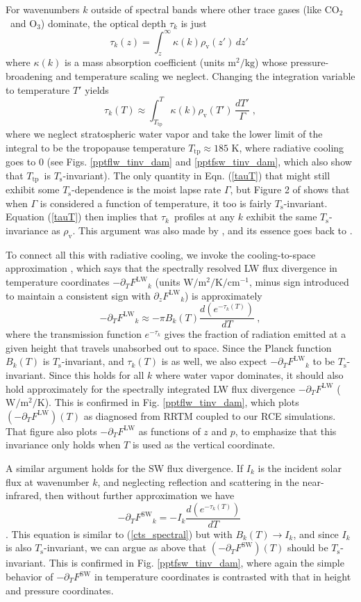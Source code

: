 \documentclass[10pt]{article}
\newcommand{\beqn}{\begin{equation}}
\newcommand{\eeqn}{\end{equation}}
\newcommand{\eqnref}[1]{(\ref{#1})}
\newcommand{\der}[2]{\ensuremath{\frac{d #1}{d #2}}}
\newcommand{\ppz}{\ensuremath{\partial_z}}
\newcommand{\ppt}{\ensuremath{\partial_T}}
\newcommand{\cotwo}{\ensuremath{\mathrm{CO_2}}}
\newcommand{\othree}{\ensuremath{\mathrm{O_3}}}
\newcommand{\FLW}{\ensuremath{F^\mathrm{LW}}}
\newcommand{\FSW}{\ensuremath{F^\mathrm{SW}}}
\newcommand{\cminverse}{\ensuremath{\mathrm{cm^{-1}}}}
\newcommand{\tauk}{\ensuremath{\tau_k}}
\newcommand{\Wmsq}{\ensuremath{\mathrm{W/m^2}}}
\newcommand{\rhov}{\ensuremath{\rho_\mathrm{v}}}
\newcommand{\Ts}{\ensuremath{T_\mathrm{s}}}
\newcommand{\Ttp}{\ensuremath{T_\mathrm{tp}}}
\begin{document}
	 
	For wavenumbers $k$ outside of spectral bands where other trace gases (like \cotwo\ and \othree) dominate, the optical depth $\tauk$ is just
	\beqn
		\tau_k(z) = \int_z^\infty \kappa(k)  \rhov(z') \, dz'  \; 
		\label{tauz}
	\eeqn
		where $\kappa(k)$ is a  mass absorption coefficient  (units $\mathrm{m^2/kg}$) whose pressure-broadening and temperature scaling we neglect. Changing the integration variable to temperature $T'$ yields
		\beqn
		\tau_k(T) \approx \int_{\Ttp}^T \kappa(k)  \rhov(T') \, \frac{dT'}{\Gamma}  \; ,
		\label{tauT}
	\eeqn
	where we neglect stratospheric water vapor and take the lower limit of the integral to be the tropopause temperature $\Ttp \approx 185$ K, where radiative cooling goes to 0 (see Figs. \ref{pptflw_tinv_dam} and  \ref{pptfsw_tinv_dam}, which also show that \Ttp\ is \Ts-invariant). The only quantity in Eqn. \eqnref{tauT} that might still exhibit some \Ts-dependence is the  moist lapse rate $\Gamma$, but Figure 2 of \cite{ingram2010} shows that when $\Gamma$ is considered a function of temperature, it too is fairly  \Ts-invariant. Equation \eqnref{tauT} then implies that \tauk\ profiles at any $k$ exhibit the same \Ts-invariance as \rhov. This argument was also made by \cite{ingram2010}, and its essence goes back to  \cite{simpson1928}.
	
	To connect all this with radiative cooling, we invoke the cooling-to-space  approximation \citep[e.g.,][]{thomas2002, rodgers1966}, which says that the spectrally resolved LW flux divergence in temperature coordinates $-\ppt \FLW_k$ (units $\Wmsq/\mathrm{K}/\cminverse$, minus sign introduced to maintain a consistent sign with  $\ppz \FLW_k$) is approximately
	\beqn
		-\ppt \FLW_k \approx - \pi B_k(T) \frac{d (e^{-\tauk(T)})}{dT} \ ,
	\label{cts_spectral}
	\eeqn
where  the transmission function $e^{-\tauk}$ gives the fraction of radiation emitted at a given height that travels unabsorbed out to space. Since the Planck function $B_k(T)$ is \Ts-invariant, and $\tauk(T)$ is as well, we also expect $-\ppt \FLW_k$ to be \Ts-invariant. Since this holds for all $k$ where water vapor dominates, it should also hold approximately for the spectrally integrated LW flux divergence $-\ppt \FLW$ ($\Wmsq/\mathrm{K}$). This is confirmed in  Fig.  \ref{pptflw_tinv_dam}, which plots $(-\ppt \FLW)(T)$ as diagnosed from RRTM coupled to our  RCE simulations.  That figure also plots $-\ppt \FLW$ as functions of $z$ and $p$, to emphasize that this invariance only holds  when $T$ is used as the vertical coordinate.
	

	A similar argument holds for the SW flux divergence. If $I_k$ is the incident solar flux at wavenumber $k$, and  neglecting reflection and scattering in the  near-infrared, 
then without further approximation we have
	\beqn
		-\ppt \FSW_k = - I_k \der{(e^{-\tauk(T)})}{T}
		\
	\eeqn
\citep[c.f.][eqn. 9.26]{thomas2002}. This equation is similar to  \eqnref{cts_spectral} but with $B_k(T) \rightarrow I_k$, and since $I_k$ is also \Ts-invariant, we can argue as above that $(-\ppt \FSW)(T)$ should be \Ts-invariant. This is confirmed in Fig. \ref{pptfsw_tinv_dam}, where again the simple behavior of $-\ppt \FSW$ in temperature coordinates is contrasted with that in height and pressure coordinates.
\end{document}
